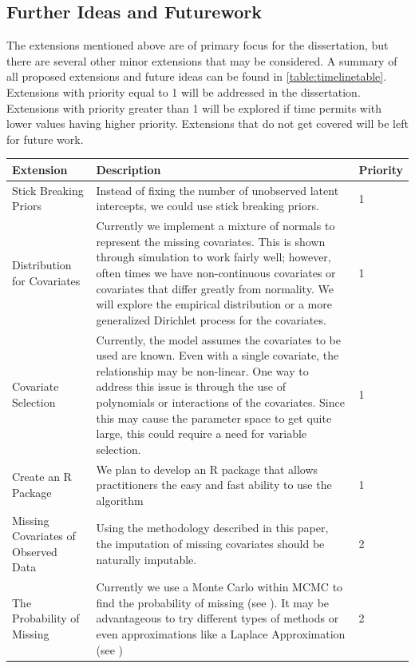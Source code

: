 \documentclass[
  12pt,
]{article}
\begin{document}
\subsection{Further Ideas and Futurework}

The extensions mentioned above are of primary focus for the
dissertation, but there are several other minor extensions that may be
considered. A summary of all proposed extensions and future ideas can be
found in \autoref{table:timelinetable}. Extensions with priority equal
to 1 will be addressed in the dissertation. Extensions with priority
greater than 1 will be explored if time permits with lower values having
higher priority. Extensions that do not get covered will be left for
future work.

\begin{table}[H]
\centering
\begin{tabular}{||p{3cm}||p{10cm}|p{1.2cm}||} 
 \hline
 Extension & Description & Priority    \\ [0.5ex] 
 \hline\hline
  Stick Breaking Priors & Instead of fixing the number of unobserved latent intercepts, we could use stick breaking priors. &  1   \\ 
 \hline
 Distribution for Covariates & Currently we implement a mixture of normals to represent the missing covariates.  This is shown through simulation to work fairly well; however, often times we have non-continuous covariates or covariates that differ greatly from normality.  We will explore the empirical distribution or a more generalized Dirichlet process for the covariates. & 1   \\
 \hline
  Covariate Selection & Currently, the model assumes the covariates to be used are known.  Even with a single covariate, the relationship may be non-linear.  One way to address this issue is through the use of polynomials or interactions of the covariates.  Since this may cause the parameter space to get quite large, this could require a need for variable selection. & 1  \\
 \hline
 Create an R Package & We plan to develop an R package that allows practitioners the easy and fast ability to use the algorithm & 1   \\ 
 \hline
 Missing Covariates of Observed Data & Using the methodology described in this paper, the imputation of missing covariates should be naturally imputable. &  2   \\ 
 \hline
 The Probability of Missing & Currently we use a Monte Carlo within MCMC to find the probability of missing (see \cite{bonner_mcmcmc_2014}).  It may be advantageous to try different types of methods or even approximations like a Laplace Approximation (see \cite{herliansyah_laplace_2022})&  2  \\

\end{tabular}
\end{table}
\end{document}
